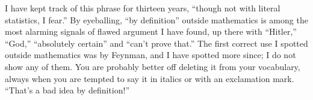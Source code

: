 I have kept track of this phrase for thirteen years, ``though not with literal statistics, I fear.'' By eyeballing, ``by definition'' outside mathematics is among the most alarming signals of flawed argument I have found, up there with ``Hitler,'' ``God,'' ``absolutely certain'' and ``can't prove that.''  The first correct use I spotted outside mathematics was by Feynman, and I have spotted more since; I do not show any of them. You are probably better off deleting it from your vocabulary, always when you are tempted to say it in italics or with an exclamation mark. ``That's a bad idea by definition!''
